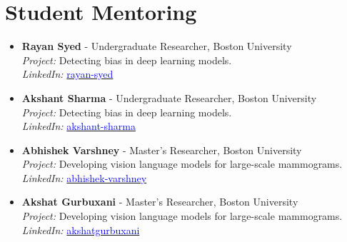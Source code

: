 \section{Student Mentoring}
\begin{itemize}[leftmargin=*, label={}]
    \item \textbf{Rayan Syed} - Undergraduate Researcher, Boston University \\
          \textit{Project:} Detecting bias in deep learning models. \\
          \textit{LinkedIn:} \href{https://www.linkedin.com/in/rayan-syed-507379296/}{\textcolor{blue}{rayan-syed}}
    \item \textbf{Akshant Sharma} - Undergraduate Researcher, Boston University \\
          \textit{Project:} Detecting bias in deep learning models. \\
          \textit{LinkedIn:} \href{https://www.linkedin.com/in/akshat-sharma-599278236/}{\textcolor{blue}{akshant-sharma}}

    \item \textbf{Abhishek Varshney} - Master's Researcher, Boston University \\
          \textit{Project:} Developing vision language models for large-scale mammograms. \\
          \textit{LinkedIn:} \href{https://www.linkedin.com/in/abhishek-varshney-a75748159/}{\textcolor{blue}{abhishek-varshney}}

    \item \textbf{Akshat Gurbuxani} - Master's Researcher, Boston University \\
          \textit{Project:} Developing vision language models for large-scale mammograms. \\
          \textit{LinkedIn:} \href{https://www.linkedin.com/in/akshatgurbuxani/}{\textcolor{blue}{akshatgurbuxani}}

          
\end{itemize}
